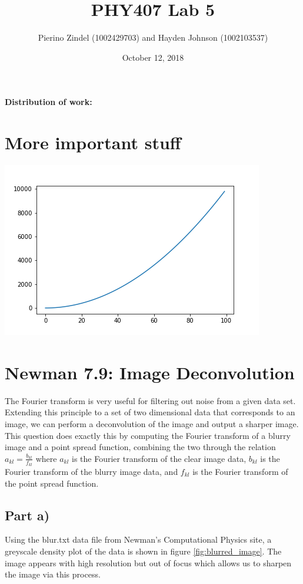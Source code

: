\documentclass{article}
\title{PHY407 Lab 5}
\author{Pierino Zindel (1002429703) and Hayden Johnson (1002103537)}
\date{October 12, 2018}
\begin{document}
\maketitle

\noindent \textbf{Distribution of work:}

\section{More important stuff}

\includegraphics{../images/name.png}

\section{Newman 7.9: Image Deconvolution}
The Fourier transform is very useful for filtering out noise from a given data set. Extending this principle to a set of two dimensional data that corresponds to an image, we can perform a deconvolution of the image and output a sharper image. This question does exactly this by computing the Fourier transform of a blurry image and a point spread function, combining the two through the relation $a_{kl} = \frac{b_{kl}}{f_{kl}}$ where $a_{kl}$ is the Fourier transform of the clear image data, $b_{kl}$ is the Fourier transform of the blurry image data, and $f_{kl}$ is the Fourier transform of the point spread function.

\subsection{Part a)}
Using the blur.txt data file from Newman's Computational Physics site, a greyscale density plot of the data is shown in figure \ref{fig:blurred_image}. The image appears with high resolution but out of focus which allows us to sharpen the image via this process.
\end{document}
